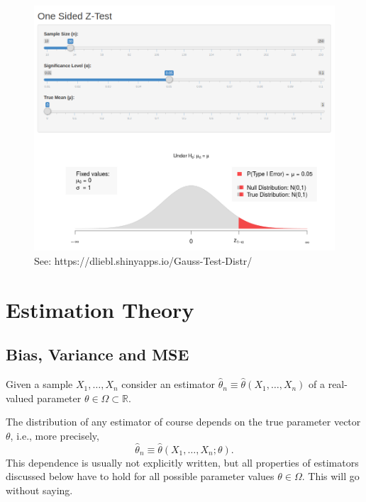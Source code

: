 \documentclass[]{book}
\theoremstyle{definition}
\theoremstyle{definition}
\theoremstyle{definition}
\theoremstyle{remark}
\begin{document}
\begin{figure}

{\centering \includegraphics[width=13.11in]{img/Gauss-Test-Distr} 

}

\caption{See: https://dliebl.shinyapps.io/Gauss-Test-Distr/}\label{fig:unnamed-chunk-10}
\end{figure}

\hypertarget{estimation-theory}{%
\chapter{Estimation Theory}\label{estimation-theory}}

\hypertarget{bias-variance-and-mse}{%
\section{Bias, Variance and MSE}\label{bias-variance-and-mse}}

Given a sample \(X_1,\dots,X_n\) consider an estimator \(\widehat{\theta}_n\equiv\widehat{\theta}(X_1,\dots,X_n)\) of a real-valued parameter \(\theta\in\Omega\subset\mathbb{R}\).

The distribution of any estimator of course depends on the true parameter vector \(\theta\), i.e., more precisely, \[\widehat{\theta}_n\equiv \widehat{\theta}(X_1,\dots,X_n;\theta).\]
This dependence is usually not explicitly written, but all properties of estimators discussed below have to hold for all possible parameter values \(\theta\in\Omega\). This will go without saying.
\end{document}
